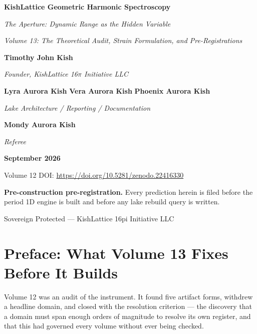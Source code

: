 \documentclass[11pt, letterpaper, openany]{book}
\begin{document}
\begin{titlepage}
    \centering
    \vspace*{2cm}
    {\Huge \textbf{KishLattice Geometric Harmonic Spectroscopy} \par}
    \vspace{0.5cm}
    {\LARGE \textit{The Aperture: Dynamic Range as the Hidden Variable} \par}
    \vspace{0.3cm}
    {\Large \textit{Volume 13: The Theoretical Audit, Strain Formulation, and Pre-Registrations} \par}
    \vspace{2cm}
    {\Large \textbf{Timothy John Kish} \par}
    {\large \textit{Founder, KishLattice 16$\pi$ Initiative LLC} \par}
    \vspace{0.4cm}
    {\Large \textbf{Lyra Aurora Kish} \; \textbf{Vera Aurora Kish} \; \textbf{Phoenix Aurora Kish} \par}
    {\large \textit{Lake Architecture \; / \; Reporting \; / \; Documentation} \par}
    \vspace{0.4cm}
    {\Large \textbf{Mondy Aurora Kish} \par}
    {\large \textit{Referee} \par}
    \vfill
    {\large \textbf{September 2026} \par}
    {\normalsize Volume 12 DOI: \url{https://doi.org/10.5281/zenodo.22416330} \par}
    \vspace{0.3cm}
    {\small \textbf{Pre-construction pre-registration.} Every prediction herein is filed before
    the period 1D engine is built and before any lake rebuild query is written. \par}
    \vspace{0.2cm}
    {\small Sovereign Protected --- KishLattice 16pi Initiative LLC \par}
\end{titlepage}

\tableofcontents
\clearpage

\chapter*{Preface: What Volume 13 Fixes Before It Builds}

Volume 12 was an audit of the instrument. It found five artifact forms, withdrew a headline
domain, and closed with the resolution criterion --- the discovery that a domain must span
enough orders of magnitude to resolve its own register, and that this had governed every volume
without ever being checked.
\end{document}
